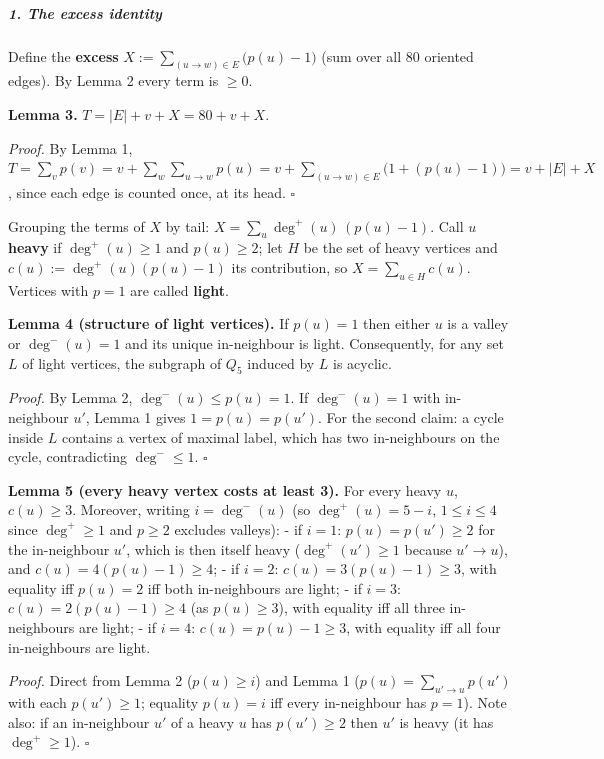 \documentclass[11pt,a4paper]{article}
\begin{document}
\subparagraph{1. The excess identity}\label{the-excess-identity}

Define the \textbf{excess} \(X:=\sum_{(u\to w)\in E}\bigl(p(u)-1\bigr)\)
(sum over all \(80\) oriented edges). By Lemma 2 every term is \(\ge0\).

\textbf{Lemma 3.} \(T=|E|+v+X = 80+v+X\).

\emph{Proof.} By Lemma 1,
\(T=\sum_v p(v)=v+\sum_{w}\sum_{u\to w}p(u)=v+\sum_{(u\to w)\in E}\bigl(1+(p(u)-1)\bigr)=v+|E|+X\),
since each edge is counted once, at its head. \(\square\)

Grouping the terms of \(X\) by tail: \(X=\sum_u \deg^+(u)\,(p(u)-1)\).
Call \(u\) \textbf{heavy} if \(\deg^+(u)\ge1\) and \(p(u)\ge2\); let
\(H\) be the set of heavy vertices and \(c(u):=\deg^+(u)(p(u)-1)\) its
contribution, so \(X=\sum_{u\in H}c(u)\). Vertices with \(p=1\) are
called \textbf{light}.

\textbf{Lemma 4 (structure of light vertices).} If \(p(u)=1\) then
either \(u\) is a valley or \(\deg^-(u)=1\) and its unique in-neighbour
is light. Consequently, for any set \(L\) of light vertices, the
subgraph of \(Q_5\) induced by \(L\) is acyclic.

\emph{Proof.} By Lemma 2, \(\deg^-(u)\le p(u)=1\). If \(\deg^-(u)=1\)
with in-neighbour \(u'\), Lemma 1 gives \(1=p(u)=p(u')\). For the second
claim: a cycle inside \(L\) contains a vertex of maximal label, which
has two in-neighbours on the cycle, contradicting \(\deg^-\le1\).
\(\square\)

\textbf{Lemma 5 (every heavy vertex costs at least 3).} For every heavy
\(u\), \(c(u)\ge3\). Moreover, writing \(i=\deg^-(u)\) (so
\(\deg^+(u)=5-i\), \(1\le i\le4\) since \(\deg^+\ge1\) and \(p\ge2\)
excludes valleys): - if \(i=1\): \(p(u)=p(u')\ge2\) for the in-neighbour
\(u'\), which is then itself heavy (\(\deg^+(u')\ge1\) because
\(u'\to u\)), and \(c(u)=4(p(u)-1)\ge4\); - if \(i=2\):
\(c(u)=3(p(u)-1)\ge3\), with equality iff \(p(u)=2\) iff both
in-neighbours are light; - if \(i=3\): \(c(u)=2(p(u)-1)\ge4\) (as
\(p(u)\ge3\)), with equality iff all three in-neighbours are light; - if
\(i=4\): \(c(u)=p(u)-1\ge3\), with equality iff all four in-neighbours
are light.

\emph{Proof.} Direct from Lemma 2 (\(p(u)\ge i\)) and Lemma 1
(\(p(u)=\sum_{u'\to u}p(u')\) with each \(p(u')\ge1\); equality
\(p(u)=i\) iff every in-neighbour has \(p=1\)). Note also: if an
in-neighbour \(u'\) of a heavy \(u\) has \(p(u')\ge2\) then \(u'\) is
heavy (it has \(\deg^+\ge1\)). \(\square\)
\end{document}
